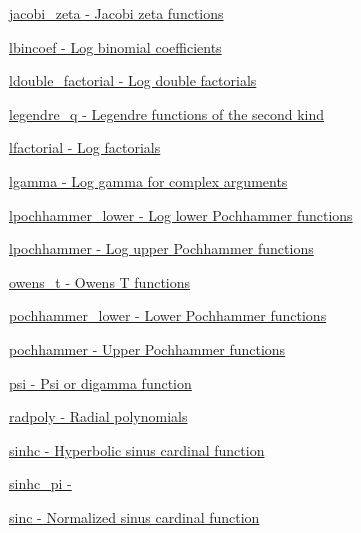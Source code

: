 \begin{DoxyItemize}
\item \hyperlink{group__gnu__math__spec__func_gafe1fc209cfe90ceee3b42e077a922045}{jacobi\+\_\+zeta -\/ Jacobi zeta functions}
\item \hyperlink{group__gnu__math__spec__func_gab6a2243313b6286cbd466c96fc7f69ed}{lbincoef -\/ Log binomial coefficients}
\item \hyperlink{group__gnu__math__spec__func_ga31ca8e7a5b1f5c883e727ed9c053edd8}{ldouble\+\_\+factorial -\/ Log double factorials}
\item \hyperlink{group__gnu__math__spec__func_ga231012f205e697c7ce1bae78f8754104}{legendre\+\_\+q -\/ Legendre functions of the second kind}
\item \hyperlink{group__gnu__math__spec__func_gaee28cc03db944a3e02fd10542016cfa8}{lfactorial -\/ Log factorials}
\item \hyperlink{group__gnu__math__spec__func_gaf70747491390b1bfc27b93ff4be6376e}{lgamma -\/ Log gamma for complex arguments}
\item \hyperlink{group__gnu__math__spec__func_ga4975d412b8e15f499a4da7b4e3f535c6}{lpochhammer\+\_\+lower -\/ Log lower Pochhammer functions}
\item \hyperlink{group__gnu__math__spec__func_ga68c4a9e8b38757a21ac54c55fe4e8dda}{lpochhammer -\/ Log upper Pochhammer functions}
\item \hyperlink{group__gnu__math__spec__func_gaa6ca4f2127c6c2101dc360673304cc2c}{owens\+\_\+t -\/ Owens T functions}
\item \hyperlink{group__gnu__math__spec__func_ga306d65eeea07613a777f506ffadac509}{pochhammer\+\_\+lower -\/ Lower Pochhammer functions}
\item \hyperlink{group__gnu__math__spec__func_ga77878c3e202c7ec3d857c3fbf661001e}{pochhammer -\/ Upper Pochhammer functions}
\item \hyperlink{group__gnu__math__spec__func_gaae7574990cdbb6a637d39c2c036928c0}{psi -\/ Psi or digamma function}
\item \hyperlink{group__gnu__math__spec__func_gac44ad9bda660a21a6b297d313f0ecf48}{radpoly -\/ Radial polynomials}
\item \hyperlink{group__gnu__math__spec__func_gabafa26d8a2e592a0e080beae71ccbb7e}{sinhc -\/ Hyperbolic sinus cardinal function}
\item \hyperlink{group__gnu__math__spec__func_ga56bea42a4701761e82567f7100d9ca5e}{sinhc\+\_\+pi -\/ }
\item \hyperlink{group__gnu__math__spec__func_ga6a11b9d949ab86f9fd170dcf0d3b1251}{sinc -\/ Normalized sinus cardinal function}

\end{DoxyItemize}
